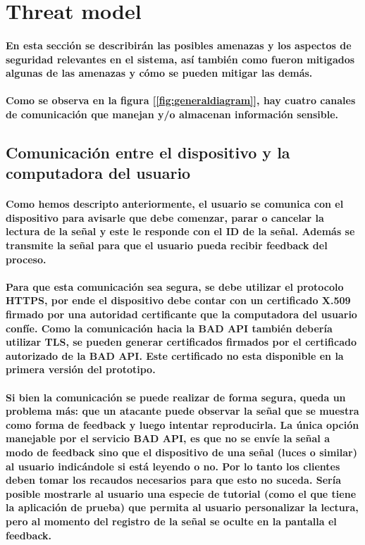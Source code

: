 \documentclass{article}
\begin{document}
\section{Threat model}
\paragraph{
En esta sección se describirán las posibles amenazas y los aspectos de seguridad relevantes en el sistema, así también como fueron mitigados algunas de las amenazas y cómo se pueden mitigar las demás.
}
\paragraph{
Como se observa en la figura [\ref{fig:generaldiagram}], hay cuatro canales de comunicación que manejan y/o almacenan información sensible.
}

\subsection{Comunicación entre el dispositivo y la computadora del usuario}
\paragraph{
Como hemos descripto anteriormente, el usuario se comunica con el dispositivo para avisarle que debe comenzar, parar o cancelar la lectura de la señal y este le responde con el ID de la señal. Además se transmite la señal para que el usuario pueda recibir feedback del proceso.
}
\paragraph{
Para que esta comunicación sea segura, se debe utilizar el protocolo HTTPS, por ende el dispositivo debe contar con un certificado X.509 firmado por una autoridad certificante que la computadora del usuario confíe. Como la comunicación hacia la BAD API también debería utilizar TLS, se pueden generar certificados firmados por el certificado autorizado de la BAD API. Este certificado no esta disponible en la primera versión del prototipo.
}
\paragraph{
Si bien la comunicación se puede realizar de forma segura, queda un problema más: que un atacante puede observar la señal que se muestra como forma de feedback y luego intentar reproducirla. La única opción manejable por el servicio BAD API, es que no se envíe la señal a modo de feedback sino que el dispositivo de una señal (luces o similar) al usuario indicándole si está leyendo o no. Por lo tanto los clientes deben tomar los recaudos necesarios para que esto no suceda. Sería posible mostrarle al usuario una especie de tutorial (como el que tiene la aplicación de prueba) que permita al usuario personalizar la lectura, pero al momento del registro de la señal se oculte en la pantalla el feedback.
}
\end{document}
